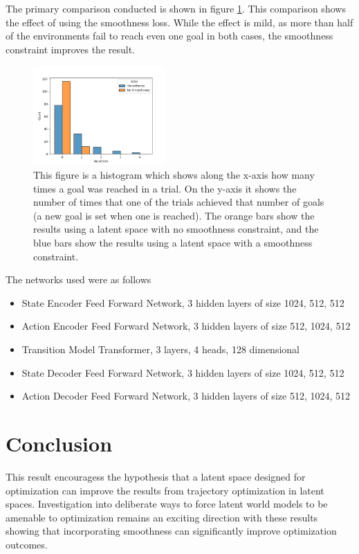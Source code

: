 \documentclass[12pt, twocolumn]{article}
\begin{document}
The primary comparison conducted is shown in figure \ref{fig:smoothness_or_no}.
This comparison shows the effect of using the smoothness loss.
While the effect is mild, as more than half of the environments fail to reach even one goal in both cases, the smoothness constraint improves the result.
\begin{figure}
    \centering
    \includegraphics[width=0.45\textwidth]{experiments/figures/smoothness_or_no.png}
    \caption{
        This figure is a histogram which shows along the x-axis how many times a goal was reached in a trial.
        On the y-axis it shows the number of times that one of the trials achieved that number of goals (a new goal is set when one is reached).
        The orange bars show the results using a latent space with no smoothness constraint, and the blue bars show the results using a latent space with a smoothness constraint.
    }
    \label{fig:smoothness_or_no}
\end{figure}

The networks used were as follows
\begin{itemize}
    \item{State Encoder} Feed Forward Network, 3 hidden layers of size 1024, 512, 512
    \item{Action Encoder} Feed Forward Network, 3 hidden layers of size 512, 1024, 512
    \item{Transition Model} Transformer, 3 layers, 4 heads, 128 dimensional
    \item{State Decoder} Feed Forward Network, 3 hidden layers of size 1024, 512, 512
    \item{Action Decoder} Feed Forward Network, 3 hidden layers of size 512, 1024, 512
\end{itemize}

\section{Conclusion}

This result encouragess the hypothesis that a latent space designed for optimization can improve the results from trajectory optimization in latent spaces.
Investigation into deliberate ways to force latent world models to be amenable to optimization remains an exciting direction with these results showing that incorporating smoothness can significantly improve optimization outcomes.



\end{document}
